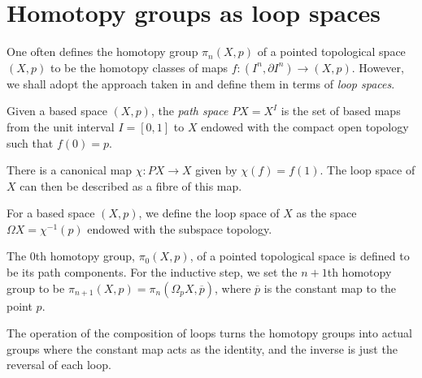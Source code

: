 \documentclass[../main.tex]{subfiles}
\begin{document}
\section{Homotopy groups as loop spaces}
One often defines the homotopy group \( \pi_n(X,p) \) of a pointed
topological space \( (X,p) \) to be the homotopy classes of maps
\( f:(I^n, \partial I^n)\rightarrow (X, p) \). However, we shall adopt
the approach taken in \cite[]{BoTu82} and define them in terms of 
\emph{loop spaces}.

\begin{definition}
Given a based space \( (X, p) \), the \emph{path space} \( PX=X^I \) is the set
of based maps from the unit interval \( I=[0,1] \) to \( X \) endowed
with the compact open topology such that \( f(0)=p \).
\end{definition}
There is a canonical map \( \chi:PX\rightarrow X \) given by \( \chi(f)=f(1) \). The loop space of \( X \) can then be described as a fibre
of this map.

\begin{definition}
   For a based space \( (X, p) \),
   we define the loop space of \( X \)
   as the space \( \Omega X=\chi^{-1}(p) \) endowed with the subspace
   topology.
\end{definition}
\begin{definition}
   \label{def:homotopy-groups}
   The \( 0 \)th homotopy group, \( \pi_0 (X, p) \), of a pointed topological space
   is defined to be its path components. For the inductive step,
   we set the \( n+1 \)th homotopy group to be \( \pi_{n+1}(X,p) = \pi_n(\Omega_{p}X, \overline{p})\),
   where \( \overline{p} \) is the constant map to the point \( p \).
\end{definition}
The operation of the composition of loops turns the homotopy
groups into actual groups where the constant map acts as the identity,
and the inverse is just the reversal of each loop.
\end{document}
